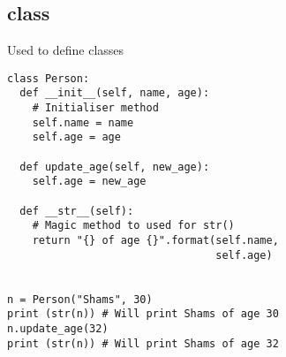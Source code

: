 \subsection{class}
Used to define classes

\begin{lstlisting}
class Person:
  def __init__(self, name, age):
    # Initialiser method
    self.name = name
    self.age = age

  def update_age(self, new_age):
    self.age = new_age

  def __str__(self):
    # Magic method to used for str()
    return "{} of age {}".format(self.name,
                                 self.age)


n = Person("Shams", 30)
print (str(n)) # Will print Shams of age 30
n.update_age(32)
print (str(n)) # Will print Shams of age 32
\end{lstlisting}
